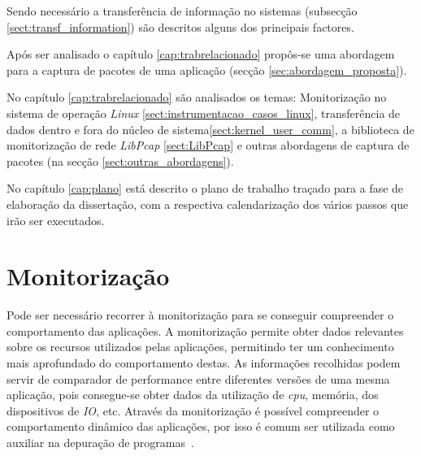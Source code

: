 Sendo necessário a transferência de informação no sistemas (subsecção \ref{sect:transf_information}) são descritos alguns dos principais factores.

Após ser analisado o capítulo \ref{cap:trabrelacionado} propôs-se uma abordagem para a captura de pacotes de uma aplicação (secção \ref{sec:abordagem_proposta}).

No capítulo \ref{cap:trabrelacionado} são analisados os temas: Monitorização no sistema de operação \textit{Linux} \ref{sect:instrumentacao_casos_linux}, transferência de dados dentro e fora do núcleo de sistema\ref{sect:kernel_user_comm}, a biblioteca de monitorização de rede \textit{LibPcap} \ref{sect:LibPcap} e outras abordagens de captura de pacotes (na secção \ref{sect:outras_abordagens}).

No capítulo \ref{cap:plano} está descrito o plano de trabalho traçado para a fase de elaboração da dissertação, com a respectiva calendarização dos vários passos que irão ser executados.

 

\section{Monitorização} \label{sect:descricao}

Pode ser necessário recorrer à monitorização para se conseguir compreender o comportamento das aplicações. A monitorização permite obter dados relevantes sobre os recursos utilizados pelas aplicações, permitindo ter um conhecimento mais aprofundado do comportamento destas. As informações recolhidas podem servir de comparador de performance entre diferentes versões de uma mesma aplicação, pois consegue-se obter dados da utilização de \textit{cpu}, memória, dos dispositivos de \textit{IO}, etc. Através da monitorização é possível compreender o comportamento dinâmico das aplicações, por isso é comum ser utilizada como auxiliar  na depuração de programas~\cite{DuartePhd05}.

